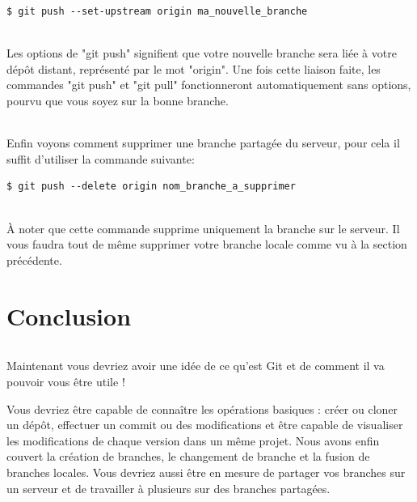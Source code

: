 \documentclass[french, a4paper, 12pt, titlepage]{article}
\begin{document}
\begin{lstlisting}
$ git push --set-upstream origin ma_nouvelle_branche
\end{lstlisting}

\paragraph{} Les options de "git push" signifient que votre nouvelle branche
sera liée à votre dépôt distant, représenté par le mot "origin". Une fois cette
liaison faite, les commandes "git push" et "git pull" fonctionneront
automatiquement sans options, pourvu que vous soyez sur la bonne branche.

\paragraph{} Enfin voyons comment supprimer une branche partagée du serveur,
pour cela il suffit d'utiliser la commande suivante:

\begin{lstlisting}
$ git push --delete origin nom_branche_a_supprimer
\end{lstlisting}

\paragraph{} À noter que cette commande supprime uniquement la branche sur le
serveur. Il vous faudra tout de même supprimer votre branche locale comme vu à
la section précédente.

\newpage
\part{Conclusion}
\paragraph{}Maintenant vous devriez avoir une idée de ce qu'est Git et de comment il va pouvoir vous être utile !

Vous devriez être capable de connaître les opérations basiques : créer ou cloner un dépôt, effectuer un commit ou des modifications et être capable de visualiser les modifications de chaque version dans un même projet.
Nous avons enfin couvert la création de branches, le changement de branche et la fusion de branches locales.
Vous devriez aussi être en mesure de partager vos branches sur un serveur et de travailler à plusieurs sur des branches partagées.
\end{document}
